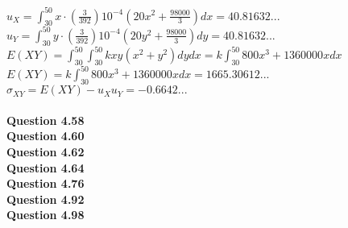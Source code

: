 \documentclass{article}
\begin{document}
        $u_X = \int_{30}^{50}x\cdot (\frac{3}{392})10^{-4}(20x^2+\frac{98000}{3})dx = 40.81632...$\\
        $u_Y = \int_{30}^{50}y\cdot (\frac{3}{392})10^{-4}(20y^2+\frac{98000}{3})dy = 40.81632...$\\
        $E(XY) = \int_{30}^{50}\int_{30}^{50}kxy(x^2+y^2)dydx = k\int_{30}^{50}800x^3+1360000xdx$\\
        $E(XY) = k\int_{30}^{50}800x^3+1360000xdx = 1665.30612...$\\
        $\sigma_{XY} = E(XY) - u_Xu_Y = -0.6642...$
        \\\\
    \textbf{Question 4.58}\\
    \textbf{Question 4.60}\\
    \textbf{Question 4.62}\\
    \textbf{Question 4.64}\\
    \textbf{Question 4.76}\\
    \textbf{Question 4.92}\\
    \textbf{Question 4.98}\\
\end{document}
